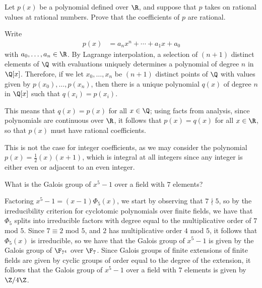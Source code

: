 \documentclass[10pt]{mypackage}
\begin{document}
\begin{problem}[Problem 6]
  Let $p(x)$ be a polynomial defined over $\R$, and suppose that $p$ takes on rational values at rational numbers. Prove that the coefficients of $p$ are rational.
\end{problem}
\begin{solution}
  Write
  \begin{align*}
    p(x) &= a_nx^{n} + \cdots + a_1 x + a_0
  \end{align*}
  with $a_0,\dots,a_n\in \R$. By Lagrange interpolation, a selection of $\left( n+1 \right)$ distinct elements of $\Q$ with evaluations uniquely determines a polynomial of degree $n$ in $\Q[x]$. Therefore, if we let $x_0,\dots,x_n$ be $\left( n+1 \right)$ distinct points of $\Q$ with values given by $p\left( x_0 \right),\dots,p\left( x_n \right)$, then there is a unique polynomial $q(x)$ of degree $n$ in $\Q[x]$ such that $q\left( x_i \right) = p\left( x_i \right)$.

  This means that $q(x) = p(x)$ for all $x\in \Q$; using facts from analysis, since polynomials are continuous over $\R$, it follows that $p(x) = q(x)$ for all $x\in \R$, so that $p(x)$ must have rational coefficients.

  This is not the case for integer coefficients, as we may consider the polynomial $p(x) = \frac{1}{2}\left( x \right)\left( x+1 \right)$, which is integral at all integers since any integer is either even or adjacent to an even integer.
\end{solution}
\begin{problem}[Problem 7]
  What is the Galois group of $x^{5}-1$ over a field with $7$ elements?
\end{problem}
\begin{solution}
  Factoring $x^5-1 = \left( x-1 \right)\Phi_5(x)$, we start by observing that $7\nmid 5$, so by the irreducibility criterion for cyclotomic polynomials over finite fields, we have that $\Phi_5$ splits into irreducible factors with degree equal to the multiplicative order of $7$ mod $5$. Since $7\equiv 2$ mod $5$, and $2$ has multiplicative order $4$ mod $5$, it follows that $\Phi_5(x)$ is irreducible, so we have that the Galois group of $x^5-1$ is given by the Galois group of $\F_{7^{4}}$ over $\F_7$. Since Galois groups of finite extensions of finite fields are given by cyclic groups of order equal to the degree of the extension, it follows that the Galois group of $x^{5}-1$ over a field with $7$ elements is given by $\Z/4\Z$.
\end{solution}
\end{document}
